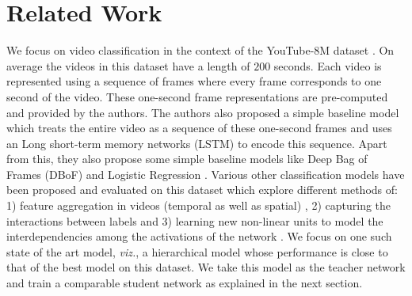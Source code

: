 \documentclass[10pt,twocolumn,letterpaper]{article}
\begin{document}
\section{Related Work}
We focus on video classification in the context of the YouTube-8M dataset \cite{Youtube8M}. On average the videos in this dataset have a length of $200$ seconds. Each video is represented using a sequence of frames where every frame corresponds to one second of the video. These one-second frame representations are pre-computed and provided by the authors. The authors also proposed a simple baseline model which treats the entire video as a sequence of these one-second frames and uses an Long short-term memory networks (LSTM) to encode this sequence. Apart from this, they also propose some simple baseline models like Deep Bag of Frames (DBoF) and Logistic Regression \cite{Youtube8M}.
Various other classification models \cite{willow, monkey-typing, temporal-models-yt8m,aggregate-frame-features, deep-models-videos} have been proposed and evaluated on this dataset which explore different methods of: 1) feature aggregation in videos
(temporal as well as spatial) \cite{aggregate-frame-features,willow}, 2) capturing the interactions between labels \cite{monkey-typing} and 3) learning new non-linear units to model the interdependencies among the activations of the network \cite{willow}. 
We focus on one such state of the art model, \textit{viz.}, a hierarchical model whose performance is close to that of %
the best model on this dataset. We take this model as the teacher network and train a comparable student network as explained in the next section.\\
\end{document}
